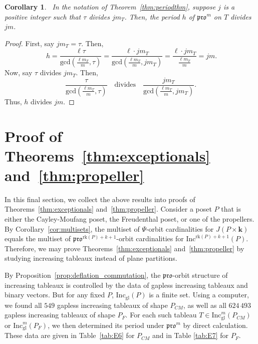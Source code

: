 \documentclass[12pt]{amsart}
\newtheorem{corollary}[theorem]{Corollary}
\theoremstyle{definition}
\theoremstyle{remark}
\numberwithin{equation}{section}
\newcommand{\inc}{\ensuremath{\mathrm{Inc}}}
\newcommand{\incgl}{\inc_{\mathrm{gl}}}
\newcommand{\pro}{\mathfrak{pro}}
\newcommand{\rank}{\ensuremath{\mathrm{rk}}}
\begin{document}
\begin{corollary}~\label{corr:pdbound}
In the notation of Theorem~\ref{thm:periodthm}, suppose $j$ is a positive integer such that $\tau$ divides $j m_T$. Then, the period $h$ of $\pro^m$ on $T$ divides $j m$. 
\end{corollary} 
\begin{proof}
First, say $j m_T = \tau$. Then,
\begin{equation}~\label{eq:pdbound} h=  \frac{\ell \tau}{\text{gcd}(\frac{\ell m_T}{m},\tau)} = \frac{\ell \cdot j m_T}{\text{gcd}(\frac{\ell m_T}{m},j m_T)} = \frac{\ell \cdot j m_T}{\frac{\ell m_T}{m}} = jm. 
\end{equation}
Now, say $\tau$ divides $jm_T$. Then, \[ \frac{\tau}{\text{gcd}(\frac{\ell m_T}{m},\tau)} \ \ \  \text{    divides   } \ \ \ \frac{j m_T}{\text{gcd}(\frac{\ell m_T}{m},j m_T)}.\] Thus, $h$ divides $j m$. 
\end{proof}

\section{Proof of Theorems~\ref{thm:exceptionals} and~\ref{thm:propeller}}\label{sec:arithmetic}

In this final section, we collect the above results into proofs of Theorems~\ref{thm:exceptionals} and~\ref{thm:propeller}. Consider a poset $P$ that is either the Cayley-Moufang poset, the Freudenthal poset, or one of the propellers. By Corollary~\ref{cor:multisets},  the multiset of $\Psi$-orbit cardinalities for $J(P \times \mathbf{k})$ equals the multiset of $\pro^{\rank(P)+ k+1}$-orbit cardinalities for $\inc^{ \rank(P)+ k+1}(P)$. Therefore, we may prove Theorems~\ref{thm:exceptionals} and~\ref{thm:propeller} by studying increasing tableaux instead of plane partitions. 

By Proposition~\ref{prop:deflation_commutation}, the $\pro$-orbit structure of increasing tableaux is controlled by the data of gapless increasing tableaux and binary vectors. But for any fixed $P$, $\incgl(P)$ is a finite set. Using a computer, we found all $549$ gapless increasing tableaux of shape $P_{CM}$, as well as all $624\, 493$ gapless increasing tableaux of shape $P_F$. For each such tableau $T \in \incgl^m(P_{CM})$ or $\incgl^m(P_F)$, we then determined its period under $\pro^m$ by direct calculation. These data are given in Table~\ref{tab:E6} for $P_{CM}$ and in Table \ref{tab:E7} for $P_F$. 
\end{document}
